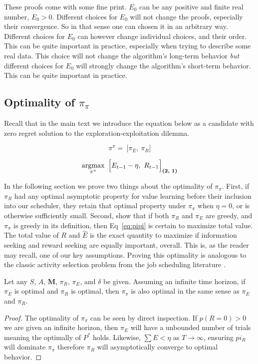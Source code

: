 These proofs come with some fine print. $E_0$ can be any positive and finite real number, $E_0 > 0$. Different choices for $E_0$ will not change the proofs, especially their convergence. So in that sense one can chosen it in an arbitrary way. Different choices for $E_0$ can however change individual choices, and their order. This can be quite important in practice, especially when trying to describe some real data.  This choice will not change the algorithm's long-term behavior \textit{but} different choices for $E_0$ will strongly change the algorithm's short-term behavior. This can be quite important in practice. 

\subsection*{Optimality of $\pi_{\pi}$} \label{sec:opt_pipi} 
Recall that in the main text we introduce the equation below as a candidate with zero regret solution to the exploration-exploitation dilemma.

\begin{equation}
\label{eq:pipi} 
\pi^{\pi} = \ \Big [ \pi_E,\ \pi_R \Big ]
\end{equation}

\begin{equation}
\label{eq:meta_greedy2} 
	\operatorname*{argmax}_{\pi^{\pi}} \ \Big [ E_{t-1} - \eta,\ R_{t-1} \Big ]_{\textbf{(2, 1)}}
\end{equation}

In the following section we prove two things about the optimality of $\pi_\pi$. First, if $\pi_R$ had any optimal asymptotic property for value learning before their inclusion into our scheduler, they retain that optimal property under $\pi_\pi$ when $\eta = 0$, or is otherwise sufficiently small. Second, show that if both $\pi_R$ and $\pi_E$ are greedy, and $\pi_\pi$ is greedy in its definition, then Eq~\ref{eq:pipi} is certain to maximize total value. The total value of $R$ and $\hat E$ is the exact quantity to maximize if information seeking and reward seeking are equally important, overall. This is, as the reader may recall, one of our key assumptions. Proving this optimality is analogous to the classic activity selection problem from the job scheduling literature \citep{BellmanBook,Roughgarden2019}.

\begin{theorem}[$\pi_{\pi}$ is unbiased] \label{theorem:meta} 
	 Let any $S$, $A$, $\mathbf{M}$, $\pi_R$, $\pi_E$, and $\delta$ be given. Assuming an infinite time horizon, if $\pi_E$ is optimal and $\pi_R$ is optimal, then $\pi_{\pi}$ is also optimal in the same sense as $\pi_E$ and $\pi_R$. 
\end{theorem}
\begin{proof}
	The optimality of $\pi_{\pi}$ can be seen by direct inspection. If $p(R = 0) > 0$ we are given an infinite horizon, then $\pi_E$ will have a unbounded number of trials meaning the optimally of $P^*$ holds. Likewise, $\sum E < \eta$ as $T \rightarrow \infty$, ensuring $pi_R$ will dominate $\pi_{\pi}$ therefore $\pi_R$ will asymptotically converge to optimal behavior. 
\end{proof}

